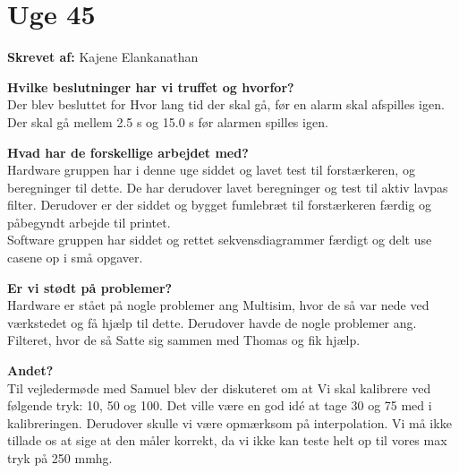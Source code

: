 \section{Uge 45}
\textbf{Skrevet af:} Kajene Elankanathan

\textbf{Hvilke beslutninger har vi truffet og hvorfor?} \\
Der blev  besluttet for Hvor lang tid der skal gå, før en alarm skal afspilles igen. \\
Der skal gå mellem 2.5 s og 15.0 s før alarmen spilles igen. 


\textbf{Hvad har de forskellige arbejdet med?} \\
Hardware gruppen har i denne uge siddet og lavet test til forstærkeren, og beregninger til dette. De har derudover lavet beregninger og test til aktiv lavpas filter. Derudover er der siddet og bygget fumlebræt til forstærkeren færdig og påbegyndt arbejde til printet. \\
Software gruppen har siddet og rettet sekvensdiagrammer færdigt og delt use casene op i små opgaver.


\textbf{Er vi stødt på problemer?} \\
Hardware er stået på nogle problemer ang Multisim, hvor de så var nede ved værkstedet og få hjælp til dette. Derudover havde de nogle problemer ang. Filteret, hvor de så Satte sig sammen med Thomas og fik hjælp.

\textbf{Andet?} \\
Til vejledermøde med Samuel blev der diskuteret om at Vi skal kalibrere ved følgende tryk: 10, 50 og 100. Det ville være en god idé at tage 30 og 75 med i kalibreringen. Derudover skulle vi være opmærksom på interpolation. Vi må ikke tillade os at sige at den måler korrekt, da vi ikke kan teste helt op til vores max tryk på 250 mmhg.

\clearpage
